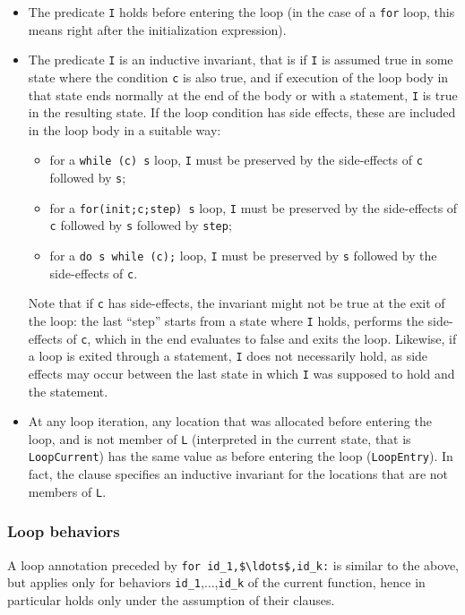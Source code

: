\begin{itemize}
\item The predicate \lstinline|I| holds before entering the loop
  (in the case of a
  \lstinline|for| loop, this means right after the initialization expression).
\item The predicate \lstinline|I| is an inductive invariant, that is
  if \lstinline|I| is assumed true in some state where the condition
  \lstinline|c| is also true, and if execution of the loop body in
  that state ends normally at the end of the body or with a
  \Continue statement, \lstinline|I| is true in the
  resulting state. 
  If the loop condition has side effects, these are
  included in the loop body in a suitable way:
  \begin{itemize}
  \item for a \lstinline|while (c) s| loop, \lstinline|I| must be
    preserved by the side-effects of \lstinline|c| followed by
    \lstinline|s|;
  \item for a \lstinline|for(init;c;step) s| loop, \lstinline|I| must
    be preserved by the side-effects of \lstinline|c| followed by
    \lstinline|s| followed by \lstinline|step|;
  \item for a \lstinline|do s while (c);| loop, \lstinline|I| must be
    preserved by \lstinline|s| followed by the side-effects of
    \lstinline|c|.
  \end{itemize}
Note that if \lstinline|c| has side-effects, the invariant might not
be true at the exit of the loop: the last ``step'' starts from a state
where \lstinline|I| holds, performs the side-effects of \lstinline|c|,
which in the end evaluates to false and exits the loop. Likewise, if a
loop is exited through a \Break statement, \lstinline|I|
does not necessarily hold, as side effects may occur between
the last state in which \lstinline|I| was supposed to hold and 
the \Break statement.

\item At any loop iteration, any location that was allocated before
  entering the loop, and is not member of \lstinline|L| (interpreted in the
  current state, that is \lstinline|LoopCurrent|) has the same value as
  before entering the loop (\lstinline|LoopEntry|).
  In fact, the \Loop \assigns clause specifies an inductive
  invariant for the locations that are not members of \lstinline|L|.
\end{itemize}

\subsubsection{Loop behaviors}
A loop annotation preceded by
\lstinline|for id_1,$\ldots$,id_k:| is similar to the above, but
applies only for behaviors \lstinline|id_1|,$\ldots$,\lstinline|id_k|
of the current function, 
hence in particular holds only under the assumption of their \assumes
clauses.


